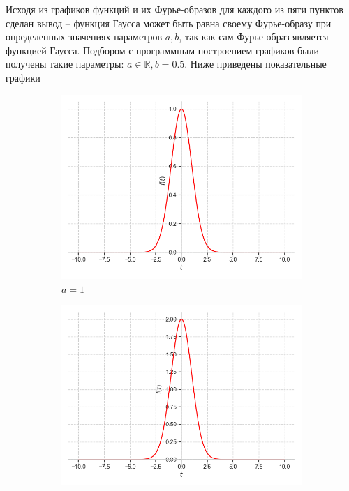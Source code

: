 \documentclass[a4paper, 16pt]{article}
\begin{document}
    \noindent Исходя из графиков функций и их Фурье-образов для каждого из пяти пунктов сделан вывод -- функция Гаусса
    может быть равна своему Фурье-образу при определенных значениях параметров $a,b$, так как сам Фурье-образ является
    функцией Гаусса. Подбором с программным построением графиков были получены такие параметры: $a\in \mathbb{R}, b=0.5$.
    Ниже приведены показательные графики
    \begin{figure}[htbp]
        \centering
        \begin{subfigure}{0.3\textwidth}
            \centering
            \includegraphics[width=\linewidth]{gauseq_a=1_b=zp5.png}
            \caption{$a=1$}
            \label{fig:gauseq_1}
        \end{subfigure}
        \hfill
        \begin{subfigure}{0.3\textwidth}
            \centering
            \includegraphics[width=\linewidth]{gauseq_a=2_b=zp5.png}

\end{subfigure}
\end{figure}
\end{document}
